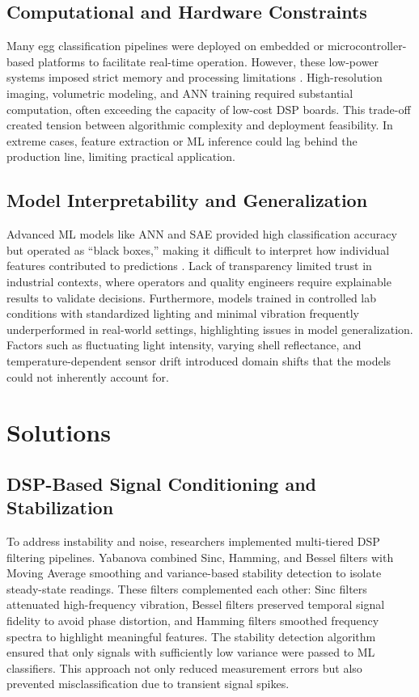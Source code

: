 \documentclass[conference]{IEEEtran}
\begin{document}
	\subsection{Computational and Hardware Constraints}
	
	Many egg classification pipelines were deployed on embedded or microcontroller-based platforms to facilitate real-time operation. However, these low-power systems imposed strict memory and processing limitations \cite{yabanova2017}\cite{secil2020}. High-resolution imaging, volumetric modeling, and ANN training required substantial computation, often exceeding the capacity of low-cost DSP boards. This trade-off created tension between algorithmic complexity and deployment feasibility. In extreme cases, feature extraction or ML inference could lag behind the production line, limiting practical application.
	
	\subsection{Model Interpretability and Generalization}
	
	Advanced ML models like ANN and SAE provided high classification accuracy but operated as “black boxes,” making it difficult to interpret how individual features contributed to predictions \cite{huang2024}. Lack of transparency limited trust in industrial contexts, where operators and quality engineers require explainable results to validate decisions. Furthermore, models trained in controlled lab conditions with standardized lighting and minimal vibration frequently underperformed in real-world settings, highlighting issues in model generalization. Factors such as fluctuating light intensity, varying shell reflectance, and temperature-dependent sensor drift introduced domain shifts that the models could not inherently account for.
	
	\section{Solutions}
	
	\subsection{DSP-Based Signal Conditioning and Stabilization}
	
	To address instability and noise, researchers implemented multi-tiered DSP filtering pipelines. Yabanova \cite{yabanova2017} combined Sinc, Hamming, and Bessel filters with Moving Average smoothing and variance-based stability detection to isolate steady-state readings. These filters complemented each other: Sinc filters attenuated high-frequency vibration, Bessel filters preserved temporal signal fidelity to avoid phase distortion, and Hamming filters smoothed frequency spectra to highlight meaningful features. The stability detection algorithm ensured that only signals with sufficiently low variance were passed to ML classifiers. This approach not only reduced measurement errors but also prevented misclassification due to transient signal spikes.
	
\end{document}
